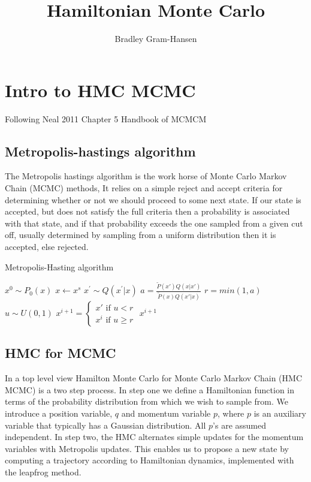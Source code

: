 \documentclass[]{report}
\title{Hamiltonian Monte Carlo}
\author{Bradley Gram-Hansen}
\begin{document}
\maketitle


\section{Intro to HMC MCMC}

Following Neal 2011 Chapter 5 Handbook of MCMCM
\subsection{Metropolis-hastings algorithm}
The Metropolis hastings algorithm is the work horse of Monte Carlo Markov Chain (MCMC) methods, It relies on a simple reject and accept criteria for determining whether or not we should proceed to some next state. If our state is accepted, but does not satisfy the full criteria then a probability is associated with that state, and if that probability exceeds the one sampled from a given cut off, usually determined by sampling from a uniform distribution then it is accepted, else rejected. 

\begin{algorithm}
\caption{Metropolis-Hasting algorithm}
\begin{algorithmic}[1]
	\State  $x^{0} \sim P_{0}(x)$ 
	\State $ x \gets x^{s} $
	\State $ x^{'} \sim Q(x^{'}|x)$
	\State $a = \frac{\tilde{P}(x')Q(x|x')}{\tilde{P}(x)Q(x'|x)}$ 
	\State $r = min(1, a) $ 
	\State $u \sim  U(0,1)$ 
	\State $x^{i+1} = \begin{cases}
	x' \text{ if $u < r$}\\
	x^{i} \text{ if $u \geq r$}
	\end{cases}$
	\EndFor
	\State \Return $x^{i+1}$
\end{algorithmic} 
\end{algorithm}

\subsection{HMC for MCMC}

In a top level view Hamilton Monte Carlo for Monte Carlo Markov Chain (HMC MCMC) is a two step process. In step one we define a Hamiltonian function in terms of the probability distribution from which we wish to sample from. We introduce a position variable, $q$ and momentum variable $p$, where $p$ is an auxiliary variable that typically has a Gaussian distribution.  All $p$'s are assumed independent. 
In step two, the HMC alternates simple updates for the momentum variables with Metropolis updates. This enables us to propose a new state by computing a trajectory according to Hamiltonian dynamics, implemented with the leapfrog method. 
\end{document}
